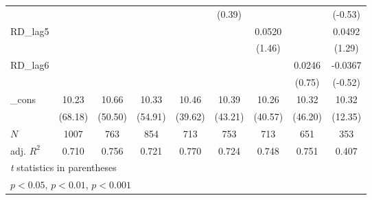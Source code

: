 {\begin{tabular}{l*{8}{c}}
            &                     &                     &                     &                     &      (0.39)         &                     &                     &     (-0.53)         \\
\addlinespace
RD\_lag5     &                     &                     &                     &                     &                     &      0.0520         &                     &      0.0492         \\
            &                     &                     &                     &                     &                     &      (1.46)         &                     &      (1.29)         \\
\addlinespace
RD\_lag6     &                     &                     &                     &                     &                     &                     &      0.0246         &     -0.0367         \\
            &                     &                     &                     &                     &                     &                     &      (0.75)         &     (-0.52)         \\
\addlinespace
\_cons      &       10.23\sym{***}&       10.66\sym{***}&       10.33\sym{***}&       10.46\sym{***}&       10.39\sym{***}&       10.26\sym{***}&       10.32\sym{***}&       10.32\sym{***}\\
            &     (68.18)         &     (50.50)         &     (54.91)         &     (39.62)         &     (43.21)         &     (40.57)         &     (46.20)         &     (12.35)         \\
\midrule
\(N\)       &        1007         &         763         &         854         &         713         &         753         &         713         &         651         &         353         \\
adj. \(R^{2}\)&       0.710         &       0.756         &       0.721         &       0.770         &       0.724         &       0.748         &       0.751         &       0.407         \\
\bottomrule
\multicolumn{9}{l}{\footnotesize \textit{t} statistics in parentheses}\\
\multicolumn{9}{l}{\footnotesize \sym{*} \(p<0.05\), \sym{**} \(p<0.01\), \sym{***} \(p<0.001\)}\\
\end{tabular}
}
